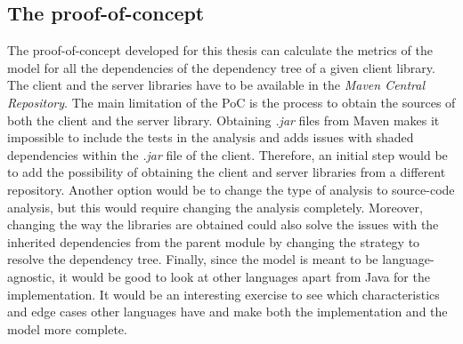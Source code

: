 
\subsection{The proof-of-concept}

The proof-of-concept developed for this thesis can calculate the metrics of the model for all the dependencies of the dependency tree of a given client library. The client and the server libraries have to be available in the \textit{Maven Central Repository}. The main limitation of the PoC is the process to obtain the sources of both the client and the server library. Obtaining \textit{.jar} files from Maven makes it impossible to include the tests in the analysis and adds issues with shaded dependencies within the \textit{.jar} file of the client. Therefore, an initial step would be to add the possibility of obtaining the client and server libraries from a different repository. Another option would be to change the type of analysis to source-code analysis, but this would require changing the analysis completely. Moreover, changing the way the libraries are obtained could also solve the issues with the inherited dependencies from the parent module by changing the strategy to resolve the dependency tree. Finally, since the model is meant to be language-agnostic, it would be good to look at other languages apart from Java for the implementation. It would be an interesting exercise to see which characteristics and edge cases other languages have and make both the implementation and the model more complete.
